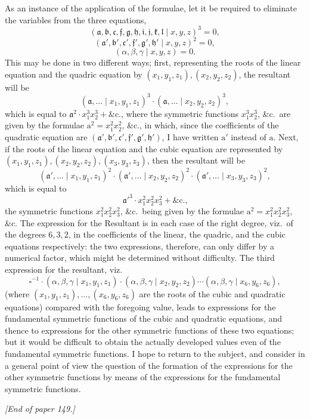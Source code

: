 \documentclass[11pt]{article}
\begin{document}
\noindent As an instance of the application of the formulae, let it be required to eliminate the variables from the three equations,
\[
(\mathfrak{a}, \mathfrak{b}, \mathfrak{c}, \mathfrak{f}, \mathfrak{g}, \mathfrak{h}, \mathfrak{i}, \mathfrak{j}, \mathfrak{k}, \mathfrak{l} \mid x, y, z)^3 = 0,
\]
\[
(\mathfrak{a}', \mathfrak{b}', \mathfrak{c}', \mathfrak{f}', \mathfrak{g}', \mathfrak{h}' \mid x, y, z)^2 = 0,
\]
\[
(\alpha, \beta, \gamma \mid x, y, z) = 0.
\]
This may be done in two different ways; first, representing the roots of the linear equation and the quadric equation by $(x_1, y_1, z_1), (x_2, y_2, z_2)$, the resultant will be
\[
(\mathfrak{a}, \ldots \mid x_1, y_1, z_1)^3 \cdot (\mathfrak{a}, \ldots \mid x_2, y_2, z_2)^3,
\]
which is equal to $\mathfrak{a}^2 \cdot x_1^3 x_2^3 + \&\text{c.}$, where the symmetric functions $x_1^3 x_2^3$, \&c.\ are given by the formulae $\mathrm{a}^2 = x_1^2 x_2^2$, \&c., in which, since the coefficients of the quadratic equation are $(\mathfrak{a}', \mathfrak{b}', \mathfrak{c}', \mathfrak{f}', \mathfrak{g}', \mathfrak{h}')$, I have written $\mathrm{a}'$ instead of $\mathrm{a}$. Next, if the roots of the linear equation and the cubic equation are represented by $(x_1, y_1, z_1), (x_2, y_2, z_2), (x_3, y_3, z_3)$, then the resultant will be
\[
(\mathfrak{a}', \ldots \mid x_1, y_1, z_1)^2 \cdot (\mathfrak{a}', \ldots \mid x_2, y_2, z_2)^2 \cdot (\mathfrak{a}', \ldots \mid x_3, y_3, z_3)^2,
\]
which is equal to
\[
\mathfrak{a}'^3 \cdot x_1^2 x_2^2 x_3^2 + \&\text{c.,}
\]
the symmetric functions $x_1^2 x_2^2 x_3^2$, \&c.\ being given by the formulae $\mathrm{a}^2 = x_1^2 x_2^2 x_3^2$, \&c. The expression for the Resultant is in each case of the right degree, viz.\ of the degrees $6, 3, 2$, in the coefficients of the linear, the quadric, and the cubic equations respectively: the two expressions, therefore, can only differ by a numerical factor, which might be determined without difficulty. The third expression for the resultant, viz.
\[
\square^{-1}\cdot (\alpha, \beta, \gamma \mid x_1, y_1, z_1)\cdot(\alpha, \beta, \gamma \mid x_2, y_2, z_2)\cdots(\alpha, \beta, \gamma \mid x_6, y_6, z_6),
\]
(where $(x_1, y_1, z_1), \ldots, (x_6, y_6, z_6)$ are the roots of the cubic and quadratic equations) compared with the foregoing value, leads to expressions for the fundamental symmetric functions of the cubic and quadratic equations, and thence to expressions for the other symmetric functions of these two equations; but it would be difficult to obtain the actually developed values even of the fundamental symmetric functions. I hope to return to the subject, and consider in a general point of view the question of the formation of the expressions for the other symmetric functions by means of the expressions for the fundamental symmetric functions.

\medskip

\noindent\textit{[End of paper 149.]}
\end{document}
